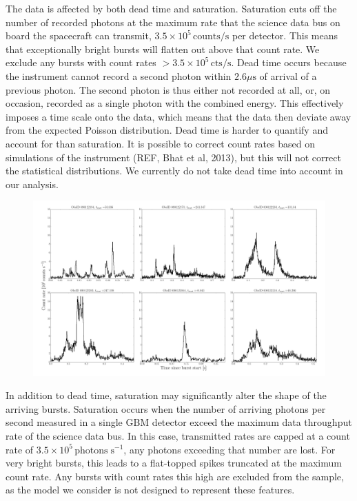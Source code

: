 \documentclass[12pt]{emulateapj}
\begin{document}
The data is affected by both dead time and saturation. Saturation cuts off the number of recorded photons at the maximum rate
that the science data bus on board the spacecraft can transmit, $3.5 \times 10^{5} \, \mathrm{counts}/\mathrm{s}$ per detector. This means
that exceptionally bright bursts will flatten out above that count rate. We exclude any bursts with count rates $>3.5\times10^{5} \, \mathrm{cts}/\mathrm{s}$.
Dead time occurs because the instrument cannot record a second photon within $2.6\mu\mathrm{s}$ of arrival of a previous photon. 
The second photon is thus either not recorded at all, or, on occasion, recorded as a single photon with the combined energy. This effectively 
imposes a time scale onto the data, which means that the data then deviate away from the expected Poisson distribution. 
Dead time is harder to quantify and account for than saturation. It is possible to correct count rates based on simulations of the instrument (REF, Bhat et al, 2013),
but this will not correct the statistical distributions. We currently do not take dead time into account in our analysis. 
\begin{figure}[h]
\begin{center}
\includegraphics[width=18cm]{example_bursts.pdf}
\caption{}
\label{fig:example_bursts}
\end{center}
\end{figure}

In addition to dead time, saturation may significantly alter the shape of the arriving bursts. Saturation occurs when the number of arriving photons per second
measured in a single GBM detector exceed the maximum data throughput rate of the science data bus. In this case, transmitted rates are capped at a 
count rate of $3.5 \times 10^{5} \, \mathrm{photons} \; \mathrm{s}^{-1}$, any photons exceeding that number are lost. For very bright bursts, this leads
to a flat-topped spikes truncated at the maximum count rate. Any bursts with count rates this high are excluded from the sample, as the model we
consider is not designed to represent these features. 
\end{document}
